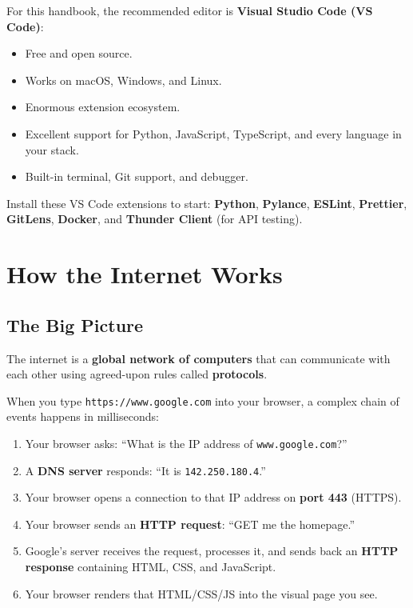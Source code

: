 \documentclass[12pt, a4paper, oneside]{book}
\begin{document}
For this handbook, the recommended editor is \textbf{Visual Studio Code (VS Code)}:
\begin{itemize}[leftmargin=2em]
    \item Free and open source.
    \item Works on macOS, Windows, and Linux.
    \item Enormous extension ecosystem.
    \item Excellent support for Python, JavaScript, TypeScript, and every language in your stack.
    \item Built-in terminal, Git support, and debugger.
\end{itemize}

\begin{tipbox}
Install these VS Code extensions to start: \textbf{Python}, \textbf{Pylance}, \textbf{ESLint}, \textbf{Prettier}, \textbf{GitLens}, \textbf{Docker}, and \textbf{Thunder Client} (for API testing).
\end{tipbox}

\section{How the Internet Works}

\subsection{The Big Picture}

The internet is a \textbf{global network of computers} that can communicate with each other using agreed-upon rules called \textbf{protocols}.

When you type \texttt{https://www.google.com} into your browser, a complex chain of events happens in milliseconds:

\begin{enumerate}[leftmargin=2em]
    \item Your browser asks: ``What is the IP address of \texttt{www.google.com}?''
    \item A \textbf{DNS server} responds: ``It is \texttt{142.250.180.4}.''
    \item Your browser opens a connection to that IP address on \textbf{port 443} (HTTPS).
    \item Your browser sends an \textbf{HTTP request}: ``GET me the homepage.''
    \item Google's server receives the request, processes it, and sends back an \textbf{HTTP response} containing HTML, CSS, and JavaScript.
    \item Your browser renders that HTML/CSS/JS into the visual page you see.
\end{enumerate}
\end{document}
